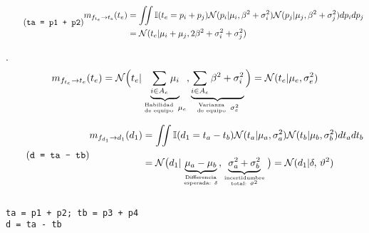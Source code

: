 \documentclass[article]{jss}
\newif\ifen
\newif\ifes
\newcommand{\en}[1]{\ifen#1\fi}
\newcommand{\es}[1]{\ifes#1\fi}
\newcommand{\N}{\mathcal{N}}
\newcommand\hfrac[2]{\genfrac{}{}{0pt}{}{#1}{#2}} %
\begin{document}
%
\en{Then, the message sent by the team factors $f_{t_e}$ to the team variable $t_e$ are,}
\es{Luego, el mensaje que env\'ian los factores equipos $f_{t_e}$ a la variable equipo $t_e$ son,}
%
\begin{equation} \label{eq:m_ft_t} \tag{\texttt{ta = p1 + p2}}
\begin{split}
 m_{f_{t_e} \rightarrow t_e}(t_e) &= \iint \mathbb{I}(t_e = p_i + p_j) \N(p_i|\mu_i,\beta^2 + \sigma_i^2)\N(p_j|\mu_j,\beta^2 + \sigma_j^2) dp_idp_j  \\ &=  \N(t_e|\mu_i+\mu_j,2\beta^2 + \sigma_i^2 + \sigma_j^2)
\end{split}
\end{equation}
%
\en{In general (demo at annex section~\ref{suma_normales_induccion})}
\es{En general (demostraci\'on en secci\'on anexa~\ref{suma_normales_induccion})}.
%
\begin{equation*}
 m_{f_{t_e} \rightarrow t_e}(t_e) =  \N \Big( t_e | \underbrace{\sum_{i\in A_e } \mu_i}_{\hfrac{\text{Habilidad}}{\text{de equipo}} \ \mu_e}, \underbrace{\sum_{i \in A_e} \beta^2 + \sigma_i^2}_{\hfrac{\text{Varianza}}{\text{de equipo}} \ \sigma_e^2} \Big) = \N(t_e | \mu_e, \sigma_e^2)
\end{equation*}
%
\en{The message sent by the difference factor $f_{d_1}$ to the difference variable $d_1$ are,}
\es{El mensaje que env\'ia el factor diferencia $f_{d_1}$ a la variable diferencia $d_1$ es,}
%
\begin{equation}\label{eq:m_fd_d} \tag{\texttt{d = ta - tb}}
 \begin{split} 
  m_{f_{d_1} \rightarrow d_1}(d_1) & = \iint \mathbb{I}(d_1 = t_a - t_b) \N(t_a| \mu_a, \sigma_a^2)  \N(t_b| \mu_b, \sigma_b^2)  dt_adt_b \\[0.25cm]
  & = \N\big( d_1 | \underbrace{\mu_a - \mu_b}_{\hfrac{\text{Differencia}}{\text{esperada:} \ \delta} }, \underbrace{\sigma_a^2 +\sigma_b^2}_{\hfrac{\text{incertidumbre}}{\text{total:} \ \vartheta^2}}  \big) = \N(d_1 | \delta, \, \vartheta^2)
 \end{split}
\end{equation}
\begin{lstlisting}[backgroundcolor=\color{white},label=lst:difference, caption=\relax, belowskip=-1.0 \baselineskip, aboveskip=-0.5 \baselineskip]
\end{lstlisting}
\begin{lstlisting}[backgroundcolor=\color{all}, belowskip=-0.77 \baselineskip]
ta = p1 + p2; tb = p3 + p4
d = ta - tb
\end{lstlisting}
\end{document}
